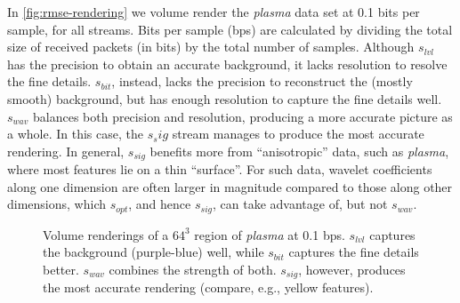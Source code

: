 In \autoref{fig:rmse-rendering} we volume render the \emph{plasma} data set at 0.1 bits per sample,
for all streams. Bits per sample (bps) are calculated by dividing the total size of received packets
(in bits) by the total number of samples. Although $s_{lvl}$ has the precision to obtain an accurate
background, it lacks resolution to resolve the fine details. $s_{bit}$, instead, lacks the precision
to reconstruct the (mostly smooth) background, but has enough resolution to capture the fine details
well. $s_{wav}$ balances both precision and resolution, producing a more accurate picture as a
whole. In this case, the $s_sig$ stream manages to produce the most accurate rendering. In general,
$s_{sig}$ benefits more from ``anisotropic'' data, such as \emph{plasma}, where most features lie on
a thin ``surface''. For such data, wavelet coefficients along one dimension are often larger in
magnitude compared to those along other dimensions, which $s_{opt}$, and hence $s_{sig}$, can take
advantage of, but not $s_{wav}$.

\begin{figure}[h]
	\centering
	 
	  
	 \caption{Volume renderings
	of a $64^3$ region of \emph{plasma} at 0.1 bps. $s_{lvl}$ captures the background (purple-blue)
	well, while $s_{bit}$ captures the fine details better. $s_{wav}$ combines the strength of both.
	$s_{sig}$, however, produces the most accurate rendering (compare, e.g., yellow
	features).}\label{fig:rmse-rendering}
\end{figure}
